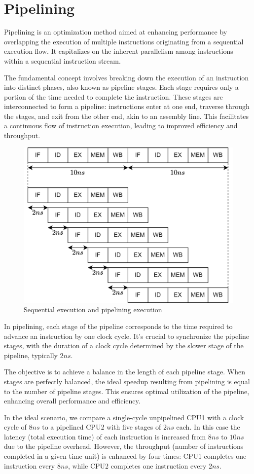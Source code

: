\section{Pipelining}

Pipelining is an optimization method aimed at enhancing performance by overlapping the execution of multiple instructions originating from a sequential execution flow. 
It capitalizes on the inherent parallelism among instructions within a sequential instruction stream.

The fundamental concept involves breaking down the execution of an instruction into distinct phases, also known as pipeline stages. 
Each stage requires only a portion of the time needed to complete the instruction.
These stages are interconnected to form a pipeline: instructions enter at one end, traverse through the stages, and exit from the other end, akin to an assembly line.
This facilitates a continuous flow of instruction execution, leading to improved efficiency and throughput.

\begin{figure}[H]
    \centering
    \includegraphics[width=0.5\linewidth]{images/exe.png}
    \caption{Sequential execution and pipelining execution}
\end{figure}

In pipelining, each stage of the pipeline corresponds to the time required to advance an instruction by one clock cycle. 
It's crucial to synchronize the pipeline stages, with the duration of a clock cycle determined by the slower stage of the pipeline, typically $2 ns$.

The objective is to achieve a balance in the length of each pipeline stage. When stages are perfectly balanced, the ideal speedup resulting from pipelining is equal to the number of pipeline stages. 
This ensures optimal utilization of the pipeline, enhancing overall performance and efficiency.

In the ideal scenario, we compare a single-cycle unpipelined CPU1 with a clock cycle of $8ns$ to a pipelined CPU2 with five stages of $2ns$ each. 
In this case the latency (total execution time) of each instruction is increased from $8ns$ to $10ns$ due to the pipeline overhead.
However, the throughput (number of instructions completed in a given time unit) is enhanced by four times: CPU1 completes one instruction every $8ns$, while CPU2 completes one instruction every $2ns$.

